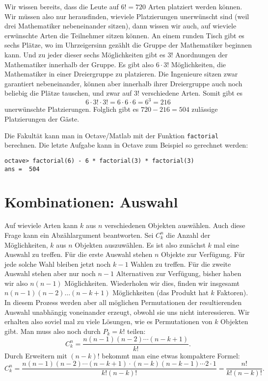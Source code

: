 \begin{beispiele}
\begin{loesung}
\begin{teilaufgaben}
Wir wissen bereits, dass die Leute auf $6!=720$ Arten platziert werden
können.
Wir müssen also nur herausfinden, wieviele Platzierungen
unerwünscht sind (weil drei Mathematiker nebeneinander sitzen),
dann wissen wir auch, auf wieviele erwünschte Arten die Teilnehmer
sitzen können.
An einem runden Tisch gibt es sechs Plätze, wo im Uhrzeigersinn gezählt 
die Gruppe der Mathematiker beginnen kann.
Und zu jeder dieser
sechs Möglichkeiten gibt es $3!$ Anordnungen der Mathematiker innerhalb
der Gruppe.
Es gibt also $6 \cdot 3!$ Möglichkeiten, die Mathematiker
in einer Dreiergruppe zu platzieren.
Die Ingenieure sitzen zwar garantiert nebeneinander, können aber
innerhalb ihrer Dreiergruppe auch noch beliebig die Plätze
tauschen, und zwar auf $3!$ verschiedene Arten.
Somit gibt es
\[
6\cdot 3!\cdot 3!=6\cdot 6\cdot 6=6^3=216
\]
unerwünschte Platzierungen.
Folglich gibt es $720-216=504$ zulässige
Platzierungen der Gäste.
\end{teilaufgaben}
\end{loesung}

\end{beispiele}

Die Fakultät kann man in Octave/Matlab mit der Funktion {\tt factorial}
berechnen.
Die letzte Aufgabe kann in Octave zum Beispiel so gerechnet
werden:
\begin{verbatim}
octave> factorial(6) - 6 * factorial(3) * factorial(3)
ans =  504
\end{verbatim}

\section{Kombinationen: Auswahl}
Auf wieviele Arten kann $k$ aus $n$ verschiedenen Objekten
auswählen.
Auch diese Frage kann ein Abzählargument
beantworten.
Sei $C^n_k$ die Anzahl der Möglichkeiten,
$k$ aus $n$ Objekten auszuwählen.
Es ist also zunächst
$k$ mal eine Auswahl zu treffen.
Für die erste Auswahl stehen $n$ Objekte zur Verfügung.
Für jede solche Wahl bleiben jetzt noch $k-1$ Wahlen zu treffen.
Für die zweite
Auswahl stehen aber nur noch $n-1$ Alternativen zur Verfügung,
bisher haben wir also $n(n-1)$ Möglichkeiten.
Wiederholen wir
dies, finden wir insgesamt $n(n-1)(n-2)\dots(n-k+1)$ Möglichkeiten
(das Produkt hat $k$ Faktoren).
In diesem Prozess werden
aber all möglichen Permutationen der resultierenden Auswahl
unabhängig voneinander erzeugt, obwohl sie uns nicht
interessieren.
Wir erhalten also soviel mal zu viele Lösungen, wie
es Permutationen von $k$ Objekten gibt.
Man muss also noch durch
$P_k=k!$ teilen:
\[
C^n_k=\frac{n(n-1)(n-2)\dotsm(n-k+1)}{k!}.
\]
Durch Erweitern mit $(n-k)!$ bekommt man eine etwas
kompaktere Formel:
\[
C^n_k
=
\frac{n(n-1)(n-2)\dotsm(n-k+1)\cdot(n-k)(n-k-1)\dotsm2\cdot 1}{k!(n-k)!}
=
\frac{n!}{k!(n-k)!}.
\]


